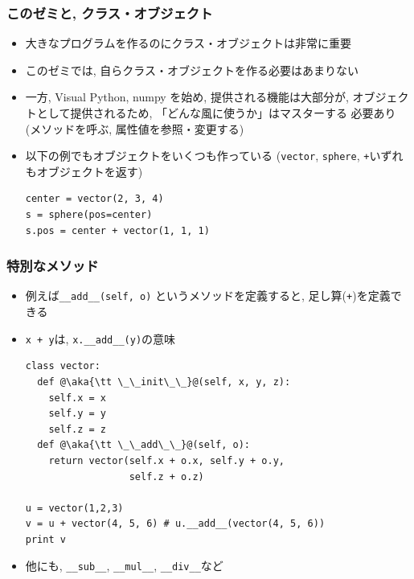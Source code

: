 \documentclass[10pt,dvipdfmx]{beamer}
\newcommand{\aka}[1]{{\color{red}#1}}
\begin{document}
\begin{frame}[fragile]
\frametitle{このゼミと, クラス・オブジェクト}
\begin{itemize}
\item 大きなプログラムを作るのにクラス・オブジェクトは非常に重要
\item このゼミでは, 
  自らクラス・オブジェクトを作る必要はあまりない
\item 一方, Visual Python, numpy を始め, 提供される機能は大部分が,
  オブジェクトとして提供されるため, 「どんな風に使うか」はマスターする
  必要あり(メソッドを呼ぶ, 属性値を参照・変更する)
\item 以下の例でもオブジェクトをいくつも作っている
  ({\tt vector}, {\tt sphere}, {\tt +}いずれもオブジェクトを返す)
\begin{lstlisting}
center = vector(2, 3, 4)
s = sphere(pos=center)
s.pos = center + vector(1, 1, 1)
\end{lstlisting}
\end{itemize}


\end{frame}

\begin{frame}[fragile]
\frametitle{特別なメソッド}
\begin{itemize}
\item 例えば{\tt \_\_add\_\_(self, o)}
というメソッドを定義すると, 足し算({\tt +})を定義できる
\item {\tt x + y}は, {\tt x.\_\_add\_\_(y)}の意味

\begin{lstlisting}
class vector:
  def @\aka{\tt \_\_init\_\_}@(self, x, y, z):
    self.x = x
    self.y = y
    self.z = z
  def @\aka{\tt \_\_add\_\_}@(self, o):
    return vector(self.x + o.x, self.y + o.y, 
                  self.z + o.z)

u = vector(1,2,3)
v = u + vector(4, 5, 6) # u.__add__(vector(4, 5, 6))
print v
\end{lstlisting}

\item 他にも, {\tt \_\_sub\_\_}, {\tt \_\_mul\_\_}, {\tt \_\_div\_\_}など
\end{itemize}
\end{frame}
\end{document}
